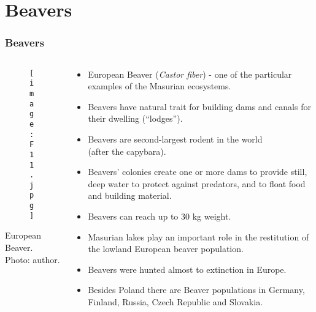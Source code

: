 \documentclass[pdflatex,compress,8pt,
	xcolor={dvipsnames,dvipsnames,svgnames,x11names,table},
	hyperref={colorlinks = true,
	breaklinks = true, urlcolor = NavyBlue, breaklinks = true}]{beamer}
\begin{document}
\section{Beavers}
\begin{frame}\frametitle{Beavers}
\begin{minipage}[0.4\textheight]{\textwidth}
\begin{columns}[T]
\begin{column}{0.3\textwidth}
\vspace{2em}
\begin{figure}[H]
	\centering
		\texttt{[image: F11.jpg]}
\end{figure}
\footnotesize{European Beaver. Photo: author.}
\end{column}
\begin{column}{0.7\textwidth}
\begin{itemize}\small
            \item European Beaver (\emph{Castor fiber}) - one of the particular examples of the Masurian ecosystems. 
            \item Beavers have natural trait for building dams and canals for their dwelling (“lodges”). 
            \item Beavers are second-largest rodent in the world \\(after the capybara). 
            \item Beavers' colonies create one or more dams to provide still, deep water to protect against predators, and to float food and building material.
            \item Beavers can reach up to 30 kg weight.
            \item Masurian lakes play an important role in the restitution of the lowland European beaver population. 
            \item Beavers were hunted almost to extinction in Europe.
            \item Besides Poland there are Beaver populations in Germany, Finland, Russia, Czech Republic and Slovakia.
\end{itemize}
\end{column}
\end{columns}
\end{minipage}
\end{frame}
\end{document}
